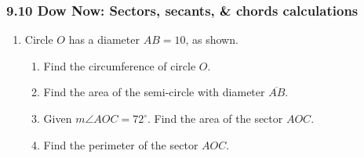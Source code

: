 \documentclass[12pt, twoside]{article}
\begin{document}
\subsubsection*{9.10 Dow Now: Sectors, secants, \& chords calculations}
 \begin{enumerate}

 \item Circle $O$ has a diameter $AB=10$, as shown.
       \begin{center}
     \end{center}
     \begin{enumerate}
       \item Find the circumference of circle $O$. \vspace{2.5cm}
       \item Find the area of the semi-circle with diameter $\overline{AB}$. \vspace{2.5cm}
       \item Given $m\angle AOC=72^\circ$. Find the area of the sector $AOC$. \vspace{2.5cm}
       \item Find the perimeter of the sector $AOC$.
     \end{enumerate}

\newpage



\end{enumerate}
\end{document}
